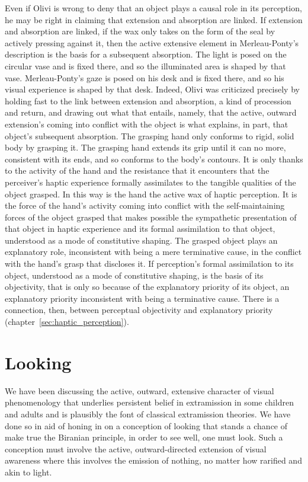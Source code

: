 Even if Olivi is wrong to deny that an object plays a causal role in its perception, he may be right in claiming that extension and absorption are linked. If extension and absorption are linked, if the wax only takes on the form of the seal by actively pressing against it, then the active extensive element in Merleau-Ponty's description is the basis for a subsequent absorption. The light is posed on the circular vase and is fixed there, and so the illuminated area is shaped by that vase. Merleau-Ponty's gaze is posed on his desk and is fixed there, and so his visual experience is shaped by that desk. Indeed, Olivi was criticized precisely by holding fast to the link between extension and absorption, a kind of procession and return, and drawing out what that entails, namely, that the active, outward extension's coming into conflict with the object is what explains, in part, that object's subsequent absorption. The grasping hand only conforms to rigid, solid body by grasping it. The grasping hand extends its grip until it can no more, consistent with its ends, and so conforms to the body's contours. It is only thanks to the activity of the hand and the resistance that it encounters that the perceiver's haptic experience formally assimilates to the tangible qualities of the object grasped. In this way is the hand the active wax of haptic perception. It is the force of the hand's activity coming into conflict with the self-maintaining forces of the object grasped that makes possible the sympathetic presentation of that object in haptic experience and its formal assimilation to that object, understood as a mode of constitutive shaping. The grasped object plays an explanatory role, inconsistent with being a mere terminative cause, in the conflict with the hand's grasp that discloses it. If perception's formal assimilation to its object, understood as a mode of constitutive shaping, is the basis of its objectivity, that is only so because of the explanatory priority of its object, an explanatory priority inconsistent with being a terminative cause. There is a connection, then, between perceptual objectivity and explanatory priority (chapter~\ref{sec:haptic_perception}).


\section{Looking} %
\label{sec:looking}

We have been discussing the active, outward, extensive character of visual phenomenology that underlies persistent belief in extramission in some children and adults and is plausibly the font of classical extramission theories. We have done so in aid of honing in on a conception of looking that stands a chance of make true the Biranian principle, in order to see well, one must look. Such a conception must involve the active, outward-directed extension of visual awareness where this involves the emission of nothing, no matter how rarified and akin to light. 

